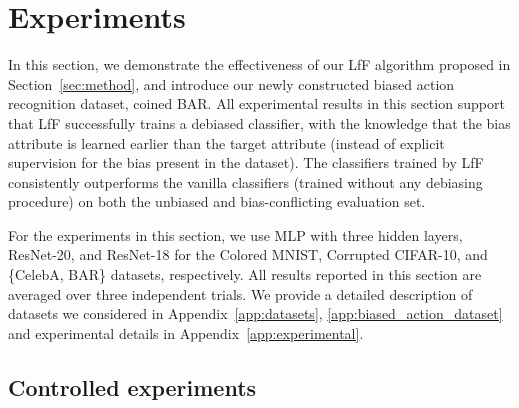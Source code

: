 \section{Experiments}
\label{sec:experiment}
In this section, we demonstrate the effectiveness of our LfF algorithm proposed in Section~\ref{sec:method}, and introduce our newly constructed biased action recognition dataset, coined BAR. 
All experimental results in this section support that LfF successfully trains a debiased classifier, with the knowledge that the bias attribute is learned earlier than the target attribute (instead of explicit supervision for the bias present in the dataset).
The classifiers trained by LfF consistently outperforms the vanilla classifiers (trained without any debiasing procedure) on both the unbiased and bias-conflicting evaluation set. 

For the experiments in this section, we use MLP with three hidden layers, ResNet-20, and ResNet-18 \citep{he2016deep} for the Colored MNIST, Corrupted CIFAR-10, and \{CelebA, BAR\} datasets, respectively. All results reported in this section are averaged over three independent trials. We provide a detailed description of datasets we considered in Appendix~\ref{app:datasets}, \ref{app:biased_action_dataset} and experimental details in Appendix~\ref{app:experimental}.

\subsection{Controlled experiments}

